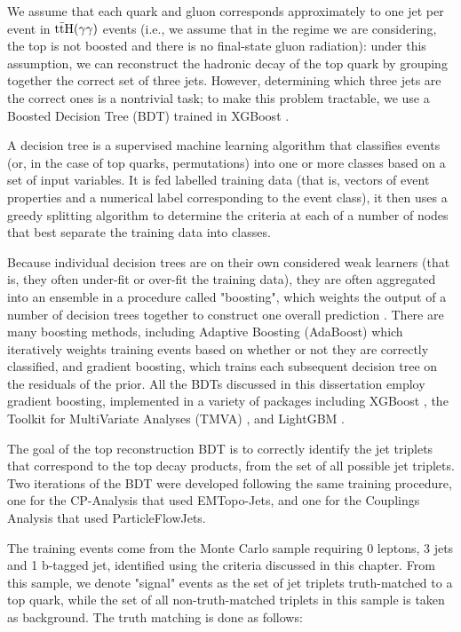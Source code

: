 We assume that each quark and gluon corresponds approximately to one jet per event in $\mathrm{t\bar{t}H}(\gamma \gamma)$ events (i.e., we assume that in the regime we are considering, the top is not boosted and there is no final-state gluon radiation): under this assumption, we can reconstruct the hadronic decay of the top quark by grouping together the correct set of three jets. However, determining which three jets are the correct ones is a nontrivial task; to make this problem tractable, we use a Boosted Decision Tree (BDT) trained in XGBoost \cite{XGBoost}.

A decision tree is a supervised machine learning algorithm that classifies events (or, in the case of top quarks, permutations) into one or more classes based on a set of input variables. It is fed labelled training data (that is, vectors of event properties and a numerical label corresponding to the event class), it then uses a greedy splitting algorithm to determine the criteria at each of a number of nodes that best separate the training data into classes.

Because individual decision trees are on their own considered weak learners (that is, they often under-fit or over-fit the training data), they are often aggregated into an ensemble in a procedure called "boosting", which weights the output of a number of decision trees together to construct one overall prediction \cite{BDTs}. There are many boosting methods, including Adaptive Boosting (AdaBoost) \cite{ADABoost}which iteratively weights training events based on whether or not they are correctly classified, and gradient boosting, which trains each subsequent decision tree on the residuals of the prior. All the BDTs discussed in this dissertation employ gradient boosting, implemented in a variety of packages including XGBoost \cite{BDTs}, the Toolkit for MultiVariate Analyses (TMVA) \cite{TMVA}, and LightGBM \cite{LightGBM}.

The goal of the top reconstruction BDT is to correctly identify the jet triplets that correspond to the top decay products, from the set of all possible jet triplets. Two iterations of the BDT were developed following the same training procedure, one for the CP-Analysis that used EMTopo-Jets, and one for the Couplings Analysis that used ParticleFlowJets.

The training events come from the \ttH Monte Carlo sample requiring 0 leptons, 3 jets and 1 b-tagged jet, identified using the criteria discussed in this chapter. From this sample, we denote "signal" events as the set of jet triplets truth-matched to a top quark, while the set of all non-truth-matched triplets in this sample is taken as background. The truth matching is done as follows:

